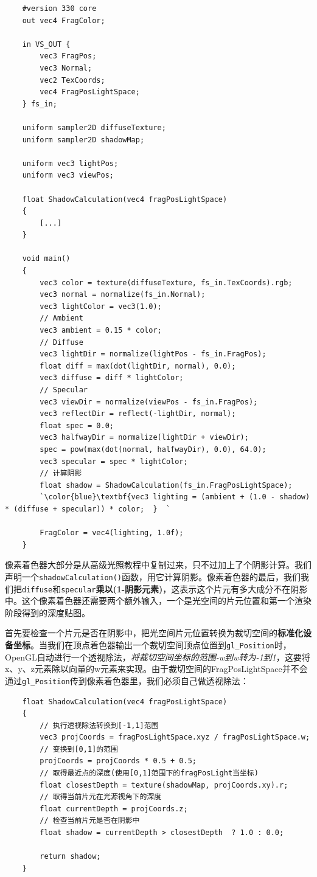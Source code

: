 \documentclass[UTF8,a4paper,12pt]{ctexbook}
\begin{document}
				\begin{lstlisting}
	#version 330 core
	out vec4 FragColor;
	
	in VS_OUT {
	    vec3 FragPos;
	    vec3 Normal;
	    vec2 TexCoords;
	    vec4 FragPosLightSpace;
	} fs_in;
	
	uniform sampler2D diffuseTexture;
	uniform sampler2D shadowMap;
	
	uniform vec3 lightPos;
	uniform vec3 viewPos;
	
	float ShadowCalculation(vec4 fragPosLightSpace)
	{
	    [...]
	}
	
	void main()
	{           
	    vec3 color = texture(diffuseTexture, fs_in.TexCoords).rgb;
	    vec3 normal = normalize(fs_in.Normal);
	    vec3 lightColor = vec3(1.0);
	    // Ambient
	    vec3 ambient = 0.15 * color;
	    // Diffuse
	    vec3 lightDir = normalize(lightPos - fs_in.FragPos);
	    float diff = max(dot(lightDir, normal), 0.0);
	    vec3 diffuse = diff * lightColor;
	    // Specular
	    vec3 viewDir = normalize(viewPos - fs_in.FragPos);
	    vec3 reflectDir = reflect(-lightDir, normal);
	    float spec = 0.0;
	    vec3 halfwayDir = normalize(lightDir + viewDir);  
	    spec = pow(max(dot(normal, halfwayDir), 0.0), 64.0);
	    vec3 specular = spec * lightColor;    
	    // 计算阴影
	    float shadow = ShadowCalculation(fs_in.FragPosLightSpace);       
	    `\color{blue}\textbf{vec3 lighting = (ambient + (1.0 - shadow) * (diffuse + specular)) * color;  }  `
	
	    FragColor = vec4(lighting, 1.0f);
	}				
				\end{lstlisting}
			
			像素着色器大部分是从高级光照教程中复制过来，只不过加上了个阴影计算。我们声明一个\verb|shadowCalculation()|函数，用它计算阴影。像素着色器的最后，我们我们把\verb|diffuse|和\verb|specular|\textbf{乘以(1-阴影元素)}，这表示这个片元有多大成分不在阴影中。这个像素着色器还需要两个额外输入，一个是光空间的片元位置和第一个渲染阶段得到的深度贴图。
			
			首先要检查一个片元是否在阴影中，把光空间片元位置转换为裁切空间的\textbf{标准化设备坐标}。当我们在顶点着色器输出一个裁切空间顶点位置到\verb|gl_Position|时，OpenGL自动进行一个透视除法，\textit{将裁切空间坐标的范围-w到w转为-1到1}，这要将x、y、z元素除以向量的w元素来实现。由于裁切空间的FragPosLightSpace并不会通过\verb|gl_Position|传到像素着色器里，我们必须自己做透视除法：
			
				\begin{lstlisting}
	float ShadowCalculation(vec4 fragPosLightSpace)
	{
	    // 执行透视除法转换到[-1,1]范围
	    vec3 projCoords = fragPosLightSpace.xyz / fragPosLightSpace.w;
	    // 变换到[0,1]的范围
	    projCoords = projCoords * 0.5 + 0.5;
	    // 取得最近点的深度(使用[0,1]范围下的fragPosLight当坐标)
	    float closestDepth = texture(shadowMap, projCoords.xy).r; 
	    // 取得当前片元在光源视角下的深度
	    float currentDepth = projCoords.z;
	    // 检查当前片元是否在阴影中
	    float shadow = currentDepth > closestDepth  ? 1.0 : 0.0;
	
	    return shadow;
	}				
				\end{lstlisting}
\end{document}

